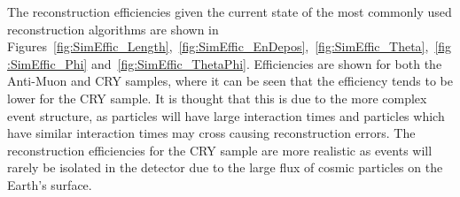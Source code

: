 The reconstruction efficiencies given the current state of the most commonly used reconstruction algorithms are shown in Figures~\ref{fig:SimEffic_Length},~\ref{fig:SimEffic_EnDepos},~\ref{fig:SimEffic_Theta},~\ref{fig:SimEffic_Phi} and~\ref{fig:SimEffic_ThetaPhi}. Efficiencies are shown for both the Anti-Muon and CRY samples, where it can be seen that the efficiency tends to be lower for the CRY sample. It is thought that this is due to the more complex event structure, as particles will have large interaction times and particles which have similar interaction times may cross causing reconstruction errors. The reconstruction efficiencies for the CRY sample are more realistic as events will rarely be isolated in the detector due to the large flux of cosmic particles on the Earth's surface. \\

